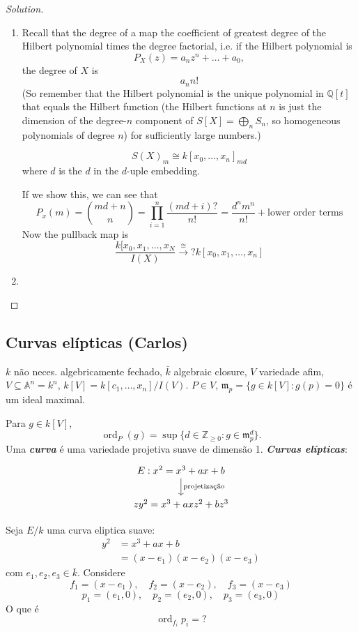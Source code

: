 \begin{proof}[Solution]\leavevmode
\begin{enumerate}[label=\alph*.]
	\item Recall that the degree of a map the coefficient of greatest degree of the Hilbert polynomial times the degree factorial, i.e. if the Hilbert polynomial is
	\[P_{X}(z)=a_nz^n+\ldots+a_0,\]
	the degree of $X$ is
	\[a_nn!\]
	(So remember that the Hilbert polynomial is the unique polynomial in $\mathbb{Q}[t]$ that equals the Hilbert function (the Hilbert functions at $n$ is just the dimension of the degree-$n$ component of $S[X]=\bigoplus_{n} S_n $, so homogeneous polynomials of degree $n$) for sufficiently large numbers.)

	\begin{claim}
		\[S(X)_m \cong k[x_0,\ldots,x_n]_{md}\]
		where $d$ is the $d$ in the $d$-uple embedding.
	\end{claim}
	If we show this, we can see that
	\[P_{x}(m)=\binom{md+n}{n}=\prod_{i=1}^n\frac{(md+i)?}{n!}=\frac{d^nm^n}{n!}+\text{lower order terms}  \]
	Now the pullback map is
	\[\frac{k[x_0,x_1,\ldots,x_N}{I(X)}\overset{\cong }{\longrightarrow}?k[x_0,x_1,\ldots,x_n]\]

	\item 
	
	\end{enumerate}

\end{proof}


\subsection{Curvas elípticas (Carlos)}

$k$ n\~ao neces. algebricamente fechado, $\bar{k}$ algebraic closure, $V$ variedade afim, $V\subseteq \mathbb{A}^n=k^n$, $k[V]=k[c_1,\ldots,x_n]/I(V)$. $P\in V$, $\mathfrak{m}_p=\{g\in k[V]:g(p)=0\}$ \'e um ideal maximal.

Para $g\in k[V]$,
\[\operatorname{ord}_P(g)=\operatorname{sup}\{d\in\mathbb{Z}_{\geq 0}:g\in\mathfrak{m}_p^d\}.\]
Uma \textit{\textbf{curva}} \'e uma variedade projetiva suave de dimens\~ao 1. \textit{\textbf{Curvas el\'ipticas}}:
\[\begin{tikzcd}
	E:x^2=x^3+ax+b\arrow[d,"\text{projetiza\c c\~ao}" ]\\
	zy^2=x^3+axz^2+bz^3
\end{tikzcd}\]

\begin{exercise}
	Seja $E/k$ uma curva eliptica suave:
	\begin{align*}
		y^2&=x^3+ax+b\\
		&=(x-e_1)(x-e_2)(x-e_3)
	\end{align*}
	com $e_1,e_2,e_3\in\bar{k}$. Considere
	\[f_1=(x-e_1),\quad f_2=(x-e_2),\quad f_3=(x-e_3)\]
	\[p_1=(e_1,0),\quad p_2=(e_2,0),\quad p_3=(e_3,0)\]
	O que \'e
	\[\operatorname{ord}_{f_i}p_i=?\]
\end{exercise}

